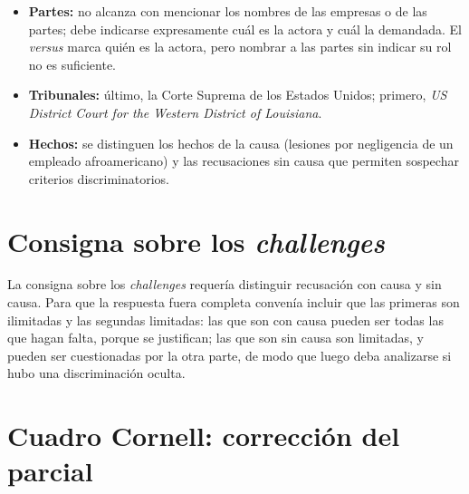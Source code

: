 \documentclass[12pt,oneside]{book}
\begin{document}
\begin{itemize}
    \item \textbf{Partes:} no alcanza con mencionar los nombres de las empresas o de las partes; debe indicarse expresamente cuál es la actora y cuál la demandada. El \textit{versus} marca quién es la actora, pero nombrar a las partes sin indicar su rol no es suficiente.
    \item \textbf{Tribunales:} último, la Corte Suprema de los Estados Unidos; primero, \textit{US District Court for the Western District of Louisiana}.
    \item \textbf{Hechos:} se distinguen los hechos de la causa (lesiones por negligencia de un empleado afroamericano) y las recusaciones sin causa que permiten sospechar criterios discriminatorios.
\end{itemize}

\section{Consigna sobre los \textit{challenges}}

La consigna sobre los \textit{challenges} requería distinguir recusación con causa y sin causa. Para que la respuesta fuera completa convenía incluir que las primeras son ilimitadas y las segundas limitadas: las que son con causa pueden ser todas las que hagan falta, porque se justifican; las que son sin causa son limitadas, y pueden ser cuestionadas por la otra parte, de modo que luego deba analizarse si hubo una discriminación oculta.

\section{Cuadro Cornell: corrección del parcial}
\end{document}
